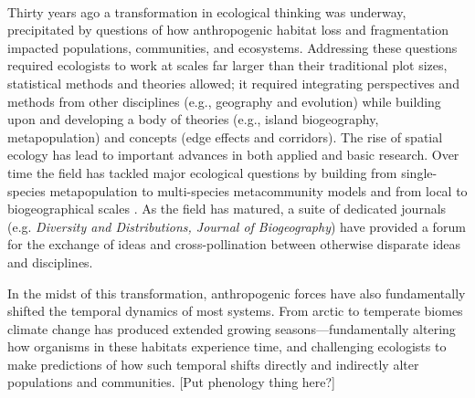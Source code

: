 \documentclass[11pt,a4paper,oneside]{article}
\begin{document}
\newpage
\linenumbers
{}\\
Thirty years ago a transformation in ecological thinking was underway, precipitated by questions of how anthropogenic habitat loss and fragmentation impacted populations, communities, and ecosystems. Addressing these questions required ecologists to work at 
scales far larger than their traditional plot sizes, statistical methods and theories allowed; it required integrating perspectives and methods from other disciplines (e.g., geography and evolution) while building upon and developing a body of theories (e.g., island biogeography, metapopulation) and concepts (edge effects and corridors). The rise of spatial ecology has lead to important advances in both applied and basic research. Over time the field has tackled major ecological questions by building from single-species metapopulation to multi-species metacommunity models \citep{Pillai2011} and from local to biogeographical scales \citep{bell2001}. As the field has matured, a suite of dedicated journals  (e.g. \emph{Diversity and Distributions, Journal of Biogeography}) have provided a forum for the exchange of ideas and cross-pollination between otherwise disparate ideas and disciplines. %

In the midst of this transformation, anthropogenic forces have also fundamentally shifted the temporal dynamics of most systems. From arctic to temperate biomes climate change has produced extended growing seasons---fundamentally altering how organisms in these habitats experience time, and challenging ecologists to make predictions of how such temporal shifts directly and indirectly alter populations and communities. [Put phenology thing here?]\\
\end{document}
